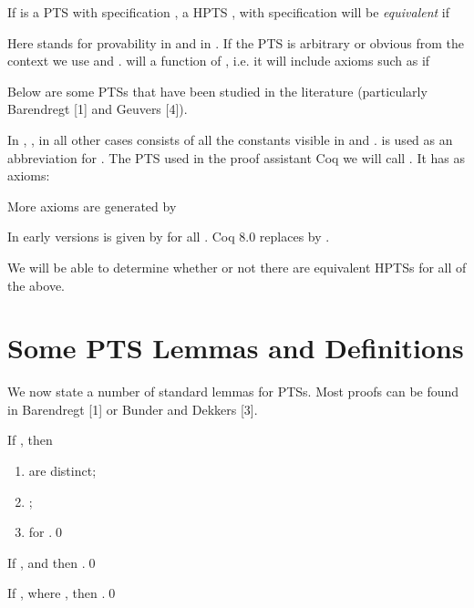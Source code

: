 \documentclass{LMCS}
\begin{document}
\begin{defi}

  If  is a PTS with specification , a HPTS , with specification
   will be \emph{equivalent} if

  Here  stands for provability in  and  in .  If the PTS is arbitrary or obvious from
  the context we use  and .  will a
  function of , i.e. it will include axioms such as
   if
  
\end{defi}

  Below are some PTSs that have been studied in the literature
  (particularly Barendregt [1] and Geuvers [4]).

  In , , in
  all other cases  consists of all the
  constants visible in  and .  
  is used as an abbreviation for .
\bigskip
{\small}
  The PTS used in the proof assistant Coq we will call .
  It has as axioms:

  More axioms are generated by

  In early versions  is given by
 for all .
  Coq 8.0 replaces  by .

  We will be able to determine whether or not there are equivalent
  HPTSs for all of the above.

\section{Some PTS Lemmas and Definitions}\label{S:PTSLD}

 \noindent We now state a number of standard lemmas for PTSs.  Most
  proofs can be found in Barendregt [1] or Bunder and Dekkers [3].

\begin{lem}\label{L:one}

  If , then
\begin{enumerate}[\em(i)]
\item  are distinct;
\item ;
\item  for .\qed
\end{enumerate}
\end{lem}

\begin{lem}\label{L:two}

  If ,  and 
  then .\qed
\end{lem}

\begin{lem}\label{L:three}

  If , where , then .\qed
\end{lem}
\end{document}
